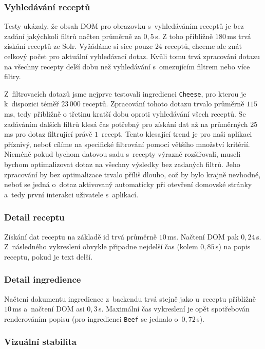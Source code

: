 \subsubsection{Vyhledávání receptů}

Testy ukázaly, že obsah DOM pro obrazovku s~vyhledáváním receptů je bez zadání jakýchkoli filtrů načten průměrně za $0,5\,$s. Z toho přibližně $180\,$ms trvá získání receptů ze Solr. Vyžádáme si sice pouze $24$ receptů, chceme ale znát celkový počet pro aktuální vyhledávací dotaz. Kvůli tomu trvá zpracování dotazu na všechny recepty delší dobu než vyhledávání s~omezujícím filtrem nebo více filtry.

Z~filtrovacích dotazů jsme nejprve testovali ingredienci \texttt{Cheese}, pro kterou je k~dispozici téměř $23\,000$ receptů. Zpracování tohoto dotazu trvalo průměrně $115\,$ms, tedy přibližně o třetinu kratší dobu oproti vyhledávání všech receptů. Se zadáváním dalších filtrů klesá čas potřebný pro získání dat až na průměrných $25\,$ms pro dotaz filtrující právě $1$~recept. Tento klesající trend je pro naši aplikaci příznivý, neboť cílíme na specifické filtrování pomocí většího množství kritérií. Nicméně pokud bychom datovou sadu s~recepty výrazně rozšiřovali, museli bychom optimalizovat dotaz na všechny výsledky bez zadaných filtrů. Jeho zpracování by bez optimalizace trvalo příliš dlouho, což by bylo krajně nevhodné, neboť se jedná o~dotaz aktivovaný automaticky při otevření domovské stránky a~tedy první interakci uživatele s~aplikací.

\subsubsection{Detail receptu}

Získání dat receptu na základě id trvá průměrně $10\,$ms. Načtení DOM pak $0,24\,$s. Z~následného vykreslení obvykle připadne nejdelší čas (kolem $0,85\,$s) na popis receptu, pokud je text delší.

\subsubsection{Detail ingredience}

Načtení dokumentu ingredience z~backendu trvá stejně jako u~receptu přibližně $10\,$ms a~načtení DOM asi $0,3\,$s. Maximální čas vykreslení je opět spotřebován renderováním popisu (pro ingredienci \texttt{Beef} se jednalo o~$0,72\,$s).

\subsubsection{Vizuální stabilita}

